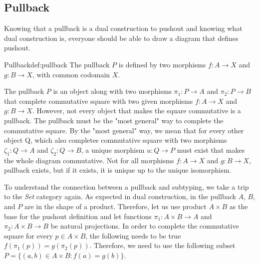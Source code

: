 \subsection{Pullback}
Knowing that a pullback is a dual construction to pushout and knowing what dual construction is, everyone should be able to draw a diagram that defines pushout.
\begin{defi}{Pullback}{def:pullback}
The pullback \cite{CategoryTheory} $P$ is defined by two morphisms $f: A \rightarrow X$ and $g: B \rightarrow X$, with common codomain $X$.
\begin{center}
\end{center}
The pullback $P$ is an object along with two morphisms $\pi_1: P \rightarrow A$ and $\pi_2: P \rightarrow B$ that complete commutative square with two given morphisms $f: A \rightarrow X$ and $g: B \rightarrow X$. However, not every object that makes the square commutative is a pullback. The pullback must be the "most general" way to complete the commutative square. By the "most general" way, we mean that for every other object Q, which also completes commutative square with two morphisms $\zeta_1: Q \rightarrow A$ and $\zeta_2: Q \rightarrow B$, a unique morphism $u: Q \rightarrow P$ must exist that makes the whole diagram commutative. Not for all morphisms $f: A \rightarrow X$ and $g: B \rightarrow X$, pullback exists, but if it exists, it is unique up to the unique isomorphism.
\end{defi}
To understand the connection between a pullback and subtyping, we take a trip to the \emph{Set} category again. As expected in dual construction, in the pullback $A$, $B$, and $P$ are in the shape of a product. Therefore, let us use product $A \times B$ as the base for the pushout definition and let functions $\pi_1: A \times B \rightarrow A$ and $\pi_2: A \times B \rightarrow B$ be natural projections. In order to complete the commutative square for every $p \in A \times B$, the following needs to be true $f (\pi_1 (p)) = g (\pi_2(p))$. Therefore, we need to use the following subset $P = \{(a, b) \in A \times B : f(a) = g(b)\}$. 
